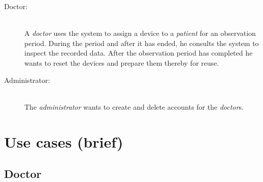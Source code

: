 \documentclass[fontsize=12pt,
               paper=a4,
               twoside=false,
               parskip=half,
               ]{scrartcl}
\begin{document}
\begin{description}

\item[Doctor:] \hfill \\
A \emph{doctor} uses the system to assign a device to a \emph{patient} for an observation period. During the period and after it has ended, he consults the system to inspect the recorded data. After the observation period has completed he wants to reset the devices and prepare them thereby for reuse.

\item[Administrator:] \hfill \\
The \emph{administrator} wants to create and delete accounts for the \emph{doctor}s.

\end{description}



\section{Use cases (brief)}

\subsection{Doctor}
\end{document}
